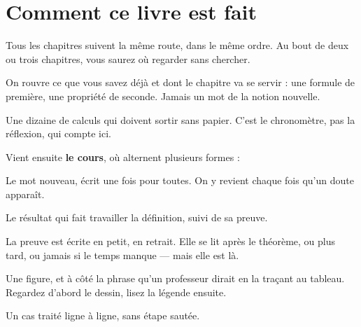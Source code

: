 \chapter*{Comment ce livre est fait}

Tous les chapitres suivent la même route, dans le même ordre. Au bout de deux
ou trois chapitres, vous saurez où regarder sans chercher.

\vspace{0.8em}

\begin{revision}
On rouvre ce que vous savez déjà et dont le chapitre va se servir : une
formule de première, une propriété de seconde. Jamais un mot de la notion
nouvelle.
\end{revision}

\begin{automatismes}
Une dizaine de calculs qui doivent sortir sans papier. C'est le chronomètre,
pas la réflexion, qui compte ici.
\end{automatismes}

\noindent Vient ensuite \textbf{le cours}, où alternent plusieurs formes :

\begin{definition}[Ce qu'on pose]
Le mot nouveau, écrit une fois pour toutes. On y revient chaque fois qu'un
doute apparaît.
\end{definition}

\begin{theoreme}[Ce qu'on démontre]
Le résultat qui fait travailler la définition, suivi de sa preuve.
\end{theoreme}

\begin{demonstration}
La preuve est écrite en petit, en retrait. Elle se lit après le théorème, ou
plus tard, ou jamais si le temps manque — mais elle est là.
\end{demonstration}

\begin{visualisation}
Une figure, et à côté la phrase qu'un professeur dirait en la traçant au
tableau. Regardez d'abord le dessin, lisez la légende ensuite.
\end{visualisation}

\begin{exemple}
Un cas traité ligne à ligne, sans étape sautée.
\end{exemple}

